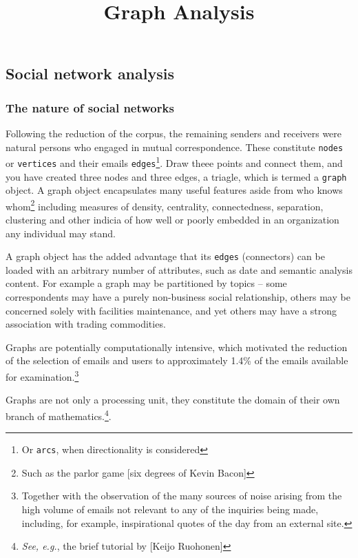 \documentclass[]{article}
\title{Graph Analysis}
\author{}
\date{}
\let\rmarkdownfootnote\footnote%
\def\footnote{\protect\rmarkdownfootnote}
\begin{document}
\maketitle

\hypertarget{social-network-analysis}{%
\subsection{Social network analysis}\label{social-network-analysis}}

\hypertarget{the-nature-of-social-networks}{%
\subsubsection{The nature of social
networks}\label{the-nature-of-social-networks}}

Following the reduction of the corpus, the remaining senders and
receivers were natural persons who engaged in mutual correspondence.
These constitute \texttt{nodes} or \texttt{vertices} and their emails
\texttt{edges}\footnote{Or \texttt{arcs}, when directionality is
  considered}. Draw theee points and connect them, and you have created
three nodes and three edges, a triagle, which is termed a \texttt{graph}
object. A graph object encapsulates many useful features aside from who
knows whom\footnote{Such as the parlor game {[}six degrees of Kevin
  Bacon{]}} including measures of density, centrality, connectedness,
separation, clustering and other indicia of how well or poorly embedded
in an organization any individual may stand.

A graph object has the added advantage that its \texttt{edges}
(connectors) can be loaded with an arbitrary number of attributes, such
as date and semantic analysis content. For example a graph may be
partitioned by topics -- some correspondents may have a purely
non-business social relationship, others may be concerned solely with
facilities maintenance, and yet others may have a strong association
with trading commodities.

Graphs are potentially computationally intensive, which motivated the
reduction of the selection of emails and users to approximately 1.4\% of
the emails available for examination.\footnote{Together with the
  observation of the many sources of noise arising from the high volume
  of emails not relevant to any of the inquiries being made, including,
  for example, inspirational quotes of the day from an external site.}

Graphs are not only a processing unit, they constitute the domain of
their own branch of mathematics.\footnote{\emph{See, e.g.}, the brief
  tutorial by {[}Keijo Ruohonen{]}}.
\end{document}
